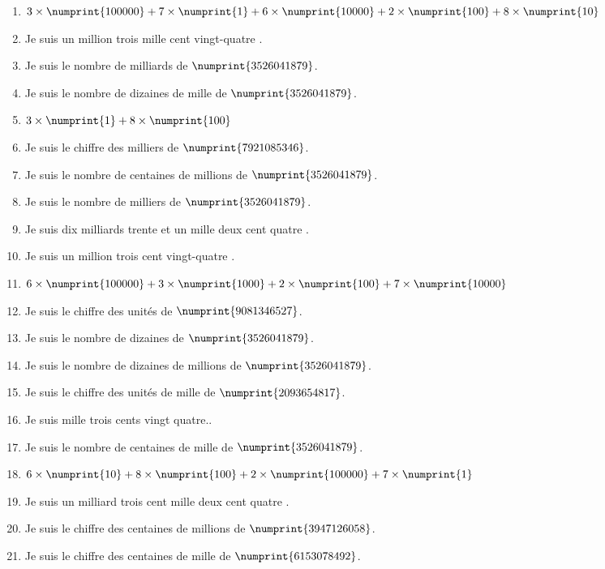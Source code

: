 \documentclass[10pt,a4paper]{article}
\newcommand{\solution}[1]{}
\begin{document}
\begin{multicols}{2}
\begin{enumerate}
\solution{\numprint{1}}
\item $3\times\numprint{100000} + 7\times\numprint{1} + 6\times\numprint{10000} + 2\times\numprint{100} + 8\times\numprint{10}$
\solution{\numprint{360287}}
\item Je suis \og un million trois mille cent vingt-quatre \fg{}.
\solution{\numprint{1003124}}
\item Je suis le nombre de milliards de $\numprint{3526041879}$.
\solution{\numprint{3}}
\item Je suis le nombre de dizaines de mille de $\numprint{3526041879}$.
\solution{\numprint{352604}}
\item $3\times\numprint{1} + 8\times\numprint{100}$
\solution{\numprint{803}}
\item Je suis le chiffre des milliers de $\numprint{7921085346}$.
\solution{\numprint{5}}
\item Je suis le nombre de centaines de millions de $\numprint{3526041879}$.
\solution{\numprint{35}}
\item Je suis le nombre de milliers de $\numprint{3526041879}$.
\solution{\numprint{3526041}}
\item Je suis \og dix milliards trente et un mille deux cent quatre \fg{}.
\solution{\numprint{10000031204}}
\item Je suis \og un million trois cent vingt-quatre \fg{}.
\solution{\numprint{1000324}}
\item $6\times\numprint{100000} + 3\times\numprint{1000} + 2\times\numprint{100} + 7\times\numprint{10000}$
\solution{\numprint{673200}}
\item Je suis le chiffre des unités de $\numprint{9081346527}$.
\solution{\numprint{7}}
\item Je suis le nombre de dizaines de $\numprint{3526041879}$.
\solution{\numprint{352604187}}
\item Je suis le nombre de dizaines de millions de $\numprint{3526041879}$.
\solution{\numprint{352}}
\item Je suis le chiffre des unités de mille de $\numprint{2093654817}$.
\solution{\numprint{4}}
\item Je suis \og mille trois cents vingt quatre.\fg.
\solution{\numprint{1324}}
\item Je suis le nombre de centaines de mille de $\numprint{3526041879}$.
\solution{\numprint{35260}}
\item $6\times\numprint{10} + 8\times\numprint{100} + 2\times\numprint{100000} + 7\times\numprint{1}$
\solution{\numprint{200867}}
\item Je suis \og un milliard trois cent mille deux cent quatre \fg{}.
\solution{\numprint{1000300204}}
\item Je suis le chiffre des centaines de millions de $\numprint{3947126058}$.
\solution{\numprint{9}}
\item Je suis le chiffre des centaines de mille de $\numprint{6153078492}$.
\solution{\numprint{0}}

\end{enumerate}
\end{multicols}
\end{document}
